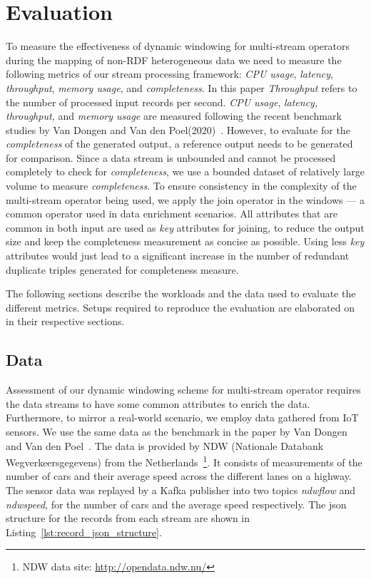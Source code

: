 \chapter{Evaluation}
\label{chap:Evaluation}

To measure the effectiveness of dynamic windowing for multi-stream operators during the 
mapping of non-RDF heterogeneous data we need to measure the following 
metrics of our stream processing framework: \emph{CPU usage},  \emph{latency}, \emph{throughput},
\emph{memory usage}, and \emph{completeness}. In this paper \emph{Throughput} refers to the number of processed input records per second.
\emph{CPU usage}, 
\emph{latency, throughput,} and \emph{memory usage} are measured following the recent 
benchmark studies by 
Van Dongen and Van den Poel(2020)~\cite{evalution_of_spe}. 
However, to evaluate 
for the \emph{completeness}
of the generated output, a reference output needs 
to be generated for comparison. Since a data stream is unbounded and cannot be processed completely to check for \emph{completeness}, we use a bounded 
dataset of relatively large volume to measure \emph{completeness}.
To ensure consistency in the complexity of the multi-stream operator being used, 
we apply the join operator in the windows --- a common operator used in 
data enrichment scenarios. All attributes that are common in both 
input are used as \emph{key} attributes for joining, 
to reduce the output size and keep the completeness measurement as concise 
as possible. Using less \emph{key} attributes would just lead to a significant increase 
in the number of redundant duplicate triples generated for completeness measure. 

The following sections describe the workloads and the data used to evaluate the
different metrics. Setups required to reproduce the evaluation are elaborated on
in their respective sections. 


\section{Data}

Assessment of our dynamic windowing scheme for multi-stream operator requires 
the data streams to have some common attributes to enrich the data. Furthermore, to 
mirror a real-world scenario, we employ data gathered from IoT sensors. 
We use the same data 
as the benchmark in the paper by Van Dongen and Van den Poel~\cite{evalution_of_spe}. 
The data is provided by NDW (Nationale Databank Wegverkeersgegevens) from the 
Netherlands~\footnote{NDW data site: \href{http://opendata.ndw.nu/}{http://opendata.ndw.nu/} }.
It consists of measurements of the number of cars and their average speed across the different 
lanes on a highway. 
The sensor data was replayed by a Kafka publisher into two topics 
\emph{ndwflow} and \emph{ndwspeed}, for the number of cars and the average speed respectively. The json 
structure for the records from each stream are shown in Listing~\ref{lst:record_json_structure}. 


